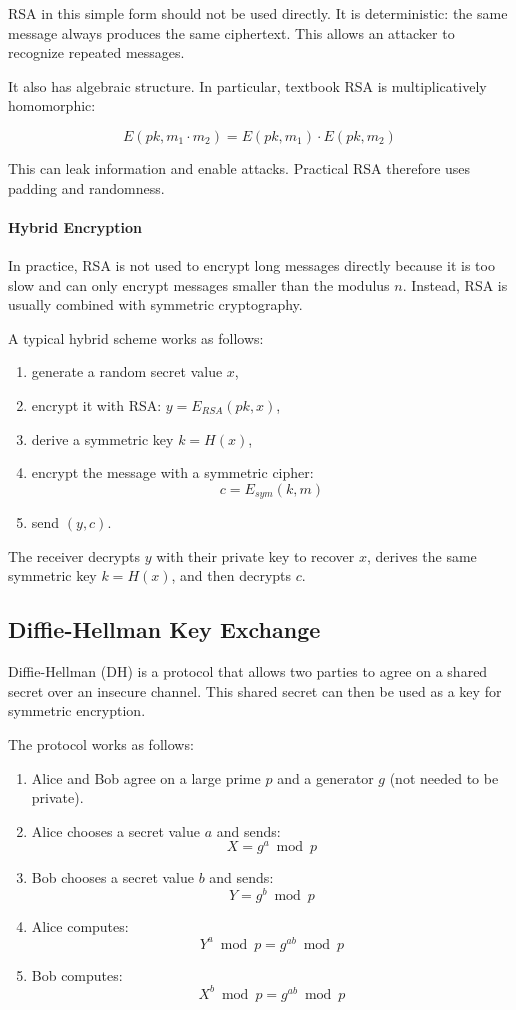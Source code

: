 RSA in this simple form should not be used directly. It is deterministic:
the same message always produces the same ciphertext. This allows an
attacker to recognize repeated messages.

It also has algebraic structure. In particular, textbook RSA is
multiplicatively homomorphic:

\[
E(pk, m_1 \cdot m_2) = E(pk,m_1) \cdot E(pk,m_2)
\]

This can leak information and enable attacks. Practical RSA therefore
uses padding and randomness.

\paragraph{Hybrid Encryption}

In practice, RSA is not used to encrypt long messages directly because
it is too slow and can only encrypt messages smaller than the modulus
$n$. Instead, RSA is usually combined with symmetric cryptography.

A typical hybrid scheme works as follows:

\begin{enumerate}
    \item generate a random secret value $x$,
    \item encrypt it with RSA\@: $y = E_{RSA}(pk,x)$,
    \item derive a symmetric key $k = H(x)$,
    \item encrypt the message with a symmetric cipher:
    \[
    c = E_{sym}(k,m)
    \]
    \item send $(y,c)$.
\end{enumerate}

The receiver decrypts $y$ with their private key to recover $x$, derives
the same symmetric key $k = H(x)$, and then decrypts $c$.

\subsection{Diffie-Hellman Key Exchange}

Diffie-Hellman (DH) is a protocol that allows two parties to agree on a
shared secret over an insecure channel. This shared secret can then be
used as a key for symmetric encryption.

The protocol works as follows:

\begin{enumerate}
    \item Alice and Bob agree on a large prime $p$ and a generator $g$ (not needed to be private).
    \item Alice chooses a secret value $a$ and sends:
    \[
    X = g^a \bmod p
    \]
    \item Bob chooses a secret value $b$ and sends:
    \[
    Y = g^b \bmod p
    \]
    \item Alice computes:
    \[
    Y^a \bmod p = g^{ab} \bmod p
    \]
    \item Bob computes:
    \[
    X^b \bmod p = g^{ab} \bmod p
    \]
\end{enumerate}

